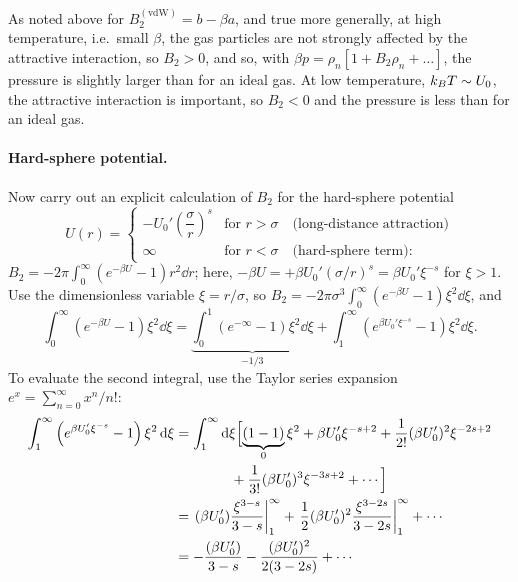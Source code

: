 As noted above for $B_2^{(\text{vdW})} = b-\beta a$, and true more generally, at high temperature, i.e.\ small $\beta$,
the gas particles are not strongly affected by the attractive interaction, so $B_2>0$, and so, with
$\beta p = \rho_n[1+B_2\rho_n+\ldots]$, the pressure is slightly larger than for an ideal gas. At low temperature,
$k_{B} T\sim U_0$, the attractive interaction is important, so $B_2<0$ and the pressure is less than for an ideal gas.

\paragraph{Hard-sphere potential.}

Now carry out an explicit calculation of $B_2$ for the hard-sphere potential
\begin{equation}
  U(r) = \begin{cases}-U_0'\left(\dfrac{\sigma}{r}\right)^s & \text{for } r>\sigma\quad\text{(long-distance attraction)}\\[6pt]
                      \infty & \text{for } r<\sigma\quad\text{(hard-sphere term)}:\end{cases}
\end{equation}
$B_2 = -2\pi\int_0^\infty(e^{-\beta U}-1)r^2\dd r$; here, $-\beta U = +\beta U_0'\left(\sigma/r\right)^s = \beta U_0'\xi^{-s}$ for
$\xi>1$. Use the dimensionless variable $\xi = r/\sigma$, so
$B_2 = -2\pi\sigma^3\int_0^\infty(e^{-\beta U}-1)\xi^2\dd\xi$, and
\begin{equation}
  \int_0^\infty(e^{-\beta U}-1)\xi^2\dd\xi
  = \underbrace{\int_0^1(e^{-\infty}-1)\xi^2\dd\xi}_{-1/3} + \int_1^\infty\left(e^{\beta U_0'\xi^{-s}}-1\right)\xi^2\dd\xi .
\end{equation}
To evaluate the second integral, use the Taylor series expansion $e^x = \sum_{n=0}^\infty x^n/n!$:
\begin{align}
  \int_1^\infty\left(e^{\beta U_0'\xi^{-s}}-1\right)\xi^2\mathop{}\!\mathrm{d}\xi
  &= \int_1^\infty\mathop{}\!\mathrm{d}\xi\Bigl[\underbrace{(1-1)}_{0}\xi^2 + \beta U_0'\xi^{-s+2} + \frac{1}{2!}(\beta U_0')^2\xi^{-2s+2}\nonumber\\
  &\qquad\qquad + \frac{1}{3!}(\beta U_0')^3\xi^{-3s+2} + \cdots\Bigr]\nonumber\\
  &= \left.(\beta U_0')\frac{\xi^{3-s}}{3-s}\right|_1^\infty + \left.\frac{1}{2}(\beta U_0')^2\frac{\xi^{3-2s}}{3-2s}\right|_1^\infty + \cdots\nonumber\\
  &= -\frac{(\beta U_0')}{3-s} - \frac{(\beta U_0')^2}{2(3-2s)} + \cdots
\end{align}
